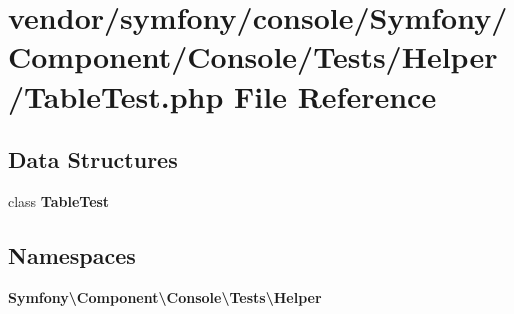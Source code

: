 \section{vendor/symfony/console/\+Symfony/\+Component/\+Console/\+Tests/\+Helper/\+Table\+Test.php File Reference}
\label{_table_test_8php}
\subsection*{Data Structures}
\begin{DoxyCompactItemize}
\item 
class {\bf Table\+Test}
\end{DoxyCompactItemize}
\subsection*{Namespaces}
\begin{DoxyCompactItemize}
\item 
 {\bf Symfony\textbackslash{}\+Component\textbackslash{}\+Console\textbackslash{}\+Tests\textbackslash{}\+Helper}
\end{DoxyCompactItemize}

